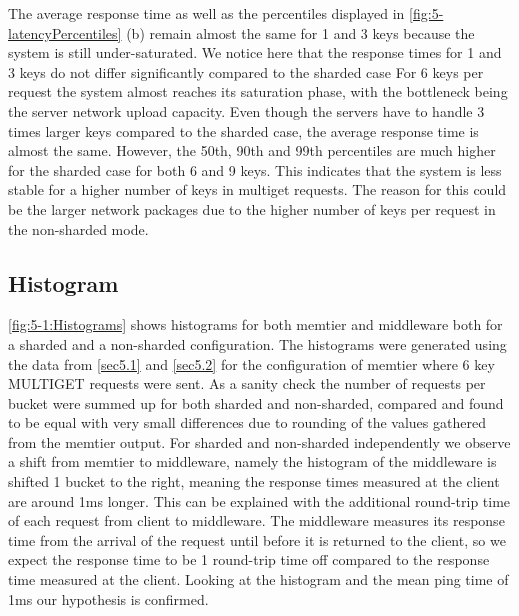 \documentclass[11pt,a4paper]{article}
\begin{document}
The average response time as well as the percentiles displayed in \autoref{fig:5-latencyPercentiles} (b) remain almost the same for 1 and 3 keys because the system is still under-saturated. We notice here that the response times for 1 and 3 keys do not differ significantly compared to the sharded case
For 6 keys per request the system almost reaches its saturation phase, with the bottleneck being the server network upload capacity. Even though the servers have to handle 3 times larger keys compared to the sharded case, the average response time is almost the same. However, the 50th, 90th and 99th percentiles are much higher for the sharded case for both 6 and 9 keys. This indicates that the system is less stable for a higher number of keys in multiget requests. The reason for this could be the larger network packages due to the higher number of keys per request in the non-sharded mode.

\subsection{Histogram}
\autoref{fig:5-1:Histograms} shows histograms for both memtier and middleware both for a sharded and a non-sharded configuration. The histograms were generated using the data from \autoref{sec5.1} and \autoref{sec5.2} for the configuration of memtier where 6 key MULTIGET requests were sent. As a sanity check the number of requests per bucket were summed up for both sharded and non-sharded, compared and found to be equal with very small differences due to rounding of the values gathered from the memtier output.
For sharded and non-sharded independently we observe a shift from memtier to middleware, namely the histogram of the middleware is shifted 1 bucket to the right, meaning the response times measured at the client are around 1ms longer. This can be explained with the additional round-trip time of each request from client to middleware. The middleware measures its response time from the arrival of the request until before it is returned to the client, so we expect the response time to be 1 round-trip time off compared to the response time measured at the client. Looking at the histogram and the mean ping time of 1ms our hypothesis is confirmed.
\end{document}
